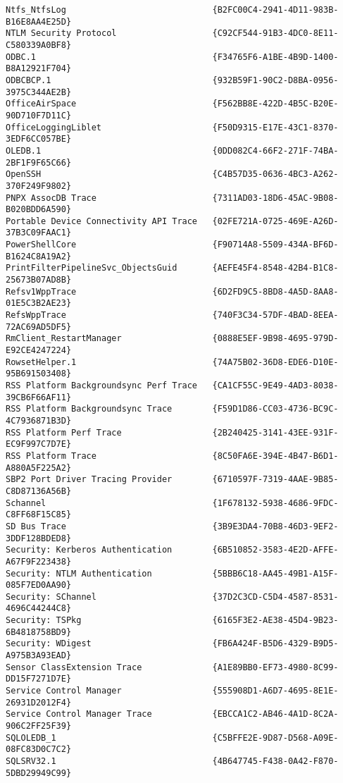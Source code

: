\documentclass{report}
\begin{document}
\begin{lstlisting}[breaklines=true,basicstyle=\tiny]
Ntfs_NtfsLog                             {B2FC00C4-2941-4D11-983B-B16E8AA4E25D}
NTLM Security Protocol                   {C92CF544-91B3-4DC0-8E11-C580339A0BF8}
ODBC.1                                   {F34765F6-A1BE-4B9D-1400-B8A12921F704}
ODBCBCP.1                                {932B59F1-90C2-D8BA-0956-3975C344AE2B}
OfficeAirSpace                           {F562BB8E-422D-4B5C-B20E-90D710F7D11C}
OfficeLoggingLiblet                      {F50D9315-E17E-43C1-8370-3EDF6CC057BE}
OLEDB.1                                  {0DD082C4-66F2-271F-74BA-2BF1F9F65C66}
OpenSSH                                  {C4B57D35-0636-4BC3-A262-370F249F9802}
PNPX AssocDB Trace                       {7311AD03-18D6-45AC-9B08-B020BDD6A590}
Portable Device Connectivity API Trace   {02FE721A-0725-469E-A26D-37B3C09FAAC1}
PowerShellCore                           {F90714A8-5509-434A-BF6D-B1624C8A19A2}
PrintFilterPipelineSvc_ObjectsGuid       {AEFE45F4-8548-42B4-B1C8-25673B07AD8B}
Refsv1WppTrace                           {6D2FD9C5-8BD8-4A5D-8AA8-01E5C3B2AE23}
RefsWppTrace                             {740F3C34-57DF-4BAD-8EEA-72AC69AD5DF5}
RmClient_RestartManager                  {0888E5EF-9B98-4695-979D-E92CE4247224}
RowsetHelper.1                           {74A75B02-36D8-EDE6-D10E-95B691503408}
RSS Platform Backgroundsync Perf Trace   {CA1CF55C-9E49-4AD3-8038-39CB6F66AF11}
RSS Platform Backgroundsync Trace        {F59D1D86-CC03-4736-BC9C-4C7936871B3D}
RSS Platform Perf Trace                  {2B240425-3141-43EE-931F-EC9F997C7D7E}
RSS Platform Trace                       {8C50FA6E-394E-4B47-B6D1-A880A5F225A2}
SBP2 Port Driver Tracing Provider        {6710597F-7319-4AAE-9B85-C8D87136A56B}
Schannel                                 {1F678132-5938-4686-9FDC-C8FF68F15C85}
SD Bus Trace                             {3B9E3DA4-70B8-46D3-9EF2-3DDF128BDED8}
Security: Kerberos Authentication        {6B510852-3583-4E2D-AFFE-A67F9F223438}
Security: NTLM Authentication            {5BBB6C18-AA45-49B1-A15F-085F7ED0AA90}
Security: SChannel                       {37D2C3CD-C5D4-4587-8531-4696C44244C8}
Security: TSPkg                          {6165F3E2-AE38-45D4-9B23-6B4818758BD9}
Security: WDigest                        {FB6A424F-B5D6-4329-B9D5-A975B3A93EAD}
Sensor ClassExtension Trace              {A1E89BB0-EF73-4980-8C99-DD15F7271D7E}
Service Control Manager                  {555908D1-A6D7-4695-8E1E-26931D2012F4}
Service Control Manager Trace            {EBCCA1C2-AB46-4A1D-8C2A-906C2FF25F39}
SQLOLEDB_1                               {C5BFFE2E-9D87-D568-A09E-08FC83D0C7C2}
SQLSRV32.1                               {4B647745-F438-0A42-F870-5DBD29949C99}

\end{lstlisting}
\end{document}
